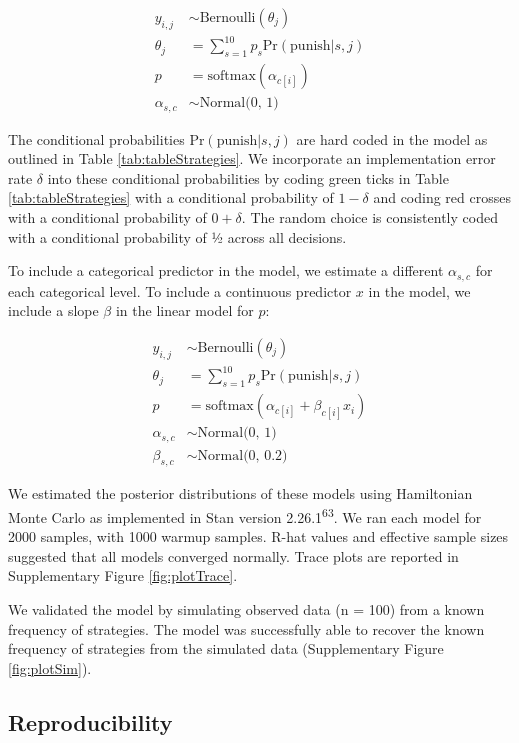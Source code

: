 \documentclass[
  man,floatsintext]{apa6}
\begin{document}
\begin{align}
y_{i,j} &\sim \text{Bernoulli}(\theta_{j}) \\
\theta_{j} &= \sum_{s=1}^{10} p_{s} \text{Pr}(\text{punish}|s,j) \nonumber \\
p &= \text{softmax}(\alpha_{c[i]}) \nonumber \\
\alpha_{s,c} &\sim \text{Normal(0, 1)} \nonumber
\end{align}

The conditional probabilities \(\text{Pr}(\text{punish}|s,j)\) are hard coded in
the model as outlined in Table \ref{tab:tableStrategies}. We incorporate an
implementation error rate \(\delta\) into these conditional probabilities by coding
green ticks in Table \ref{tab:tableStrategies} with a conditional probability
of \(1 - \delta\) and coding red crosses with a conditional probability of
\(0 + \delta\). The random choice is consistently coded with a conditional
probability of ½ across all decisions.

To include a categorical predictor in the model, we estimate a different
\(\alpha_{s,c}\) for each categorical level. To include a continuous predictor
\(x\) in the model, we include a slope \(\beta\) in the linear model for \(p\):

\begin{align}
y_{i,j} &\sim \text{Bernoulli}(\theta_{j}) \\
\theta_{j} &= \sum_{s=1}^{10} p_{s} \text{Pr}(\text{punish}|s,j) \nonumber \\
p &= \text{softmax}(\alpha_{c[i]} + \beta_{c[i]}x_{i}) \nonumber \\
\alpha_{s,c} &\sim \text{Normal(0, 1)} \nonumber \\
\beta_{s,c} &\sim \text{Normal(0, 0.2)} \nonumber
\end{align}

We estimated the posterior distributions of these models using Hamiltonian Monte
Carlo as implemented in Stan version 2.26.1\textsuperscript{63}. We ran each model for
2000 samples, with 1000 warmup samples. R-hat values and effective sample sizes
suggested that all models converged normally. Trace plots are reported in
Supplementary Figure \ref{fig:plotTrace}.

We validated the model by simulating observed data (n = 100) from a known
frequency of strategies. The model was successfully able to recover the known
frequency of strategies from the simulated data (Supplementary Figure
\ref{fig:plotSim}).

\hypertarget{reproducibility}{%
\subsection{Reproducibility}\label{reproducibility}}
\end{document}
